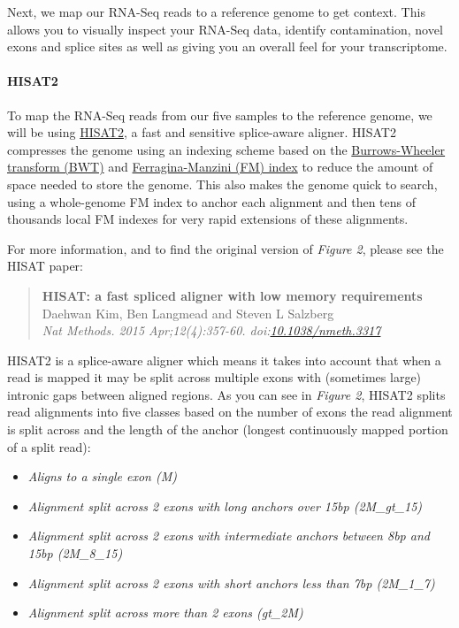 \documentclass[11pt]{article}
\providecommand{\tightlist}{%
      \setlength{\itemsep}{0pt}\setlength{\parskip}{0pt}}
\begin{document}
Next, we map our RNA-Seq reads to a reference genome to get context.
This allows you to visually inspect your RNA-Seq data, identify
contamination, novel exons and splice sites as well as giving you an
overall feel for your transcriptome.

\hypertarget{hisat2}{%
\paragraph{HISAT2}\label{hisat2}}

To map the RNA-Seq reads from our five samples to the reference genome,
we will be using
\href{https://ccb.jhu.edu/software/hisat2/index.shtml}{HISAT2}, a fast
and sensitive splice-aware aligner. HISAT2 compresses the genome using
an indexing scheme based on the
\href{https://en.wikipedia.org/wiki/Burrows\%E2\%80\%93Wheeler_transform}{Burrows-Wheeler
transform (BWT)} and
\href{https://en.wikipedia.org/wiki/FM-index}{Ferragina-Manzini (FM)
index} to reduce the amount of space needed to store the genome. This
also makes the genome quick to search, using a whole-genome FM index to
anchor each alignment and then tens of thousands local FM indexes for
very rapid extensions of these alignments.

For more information, and to find the original version of \textit{Figure
2}, please see the HISAT paper:

\begin{quote}
\textbf{HISAT: a fast spliced aligner with low memory requirements}\\
Daehwan Kim, Ben Langmead and Steven L Salzberg\\
\textit{Nat Methods. 2015 Apr;12(4):357-60.
doi:\href{https://www.nature.com/articles/nmeth.3317}{10.1038/nmeth.3317}}
\end{quote}

HISAT2 is a splice-aware aligner which means it takes into account that
when a read is mapped it may be split across multiple exons with
(sometimes large) intronic gaps between aligned regions. As you can see
in \textit{Figure 2}, HISAT2 splits read alignments into five classes
based on the number of exons the read alignment is split across and the
length of the anchor (longest continuously mapped portion of a split
read):

\begin{itemize}
\tightlist
\item
  \textit{Aligns to a single exon (M)}
\item
  \textit{Alignment split across 2 exons with long anchors over 15bp
  (2M\_gt\_15)}
\item
  \textit{Alignment split across 2 exons with intermediate anchors between
  8bp and 15bp (2M\_8\_15)}
\item
  \textit{Alignment split across 2 exons with short anchors less than 7bp
  (2M\_1\_7)}
\item
  \textit{Alignment split across more than 2 exons (gt\_2M)}
\end{itemize}
\end{document}
